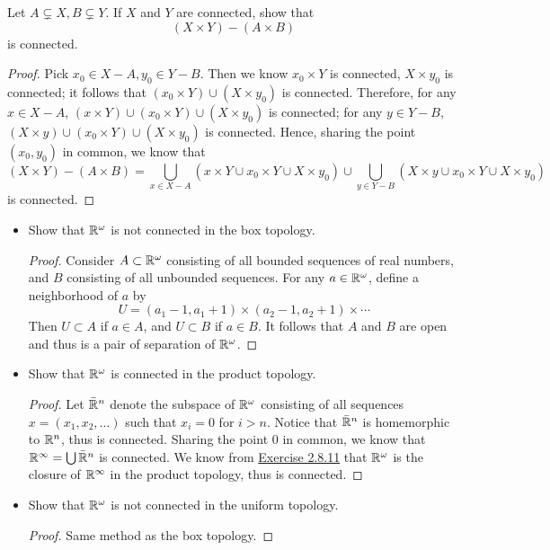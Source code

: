 \documentclass[12pt,a4paper]{article}
\begin{document}
    \begin{ex}
        Let $A\subsetneq X,B\subsetneq Y$. If $X$ and $Y$ are connected, show that 
        $$
        (X\times Y)-(A\times B)
        $$
        is connected.
    \end{ex}
    \begin{proof}
        Pick $x_0\in X-A, y_0\in Y-B$. Then we know $x_0\times Y$ is connected, $X\times y_0$ is connected; it follows that $(x_0\times Y)\cup (X\times y_0)$ is connected. Therefore, for any $x\in X-A$, $(x\times Y)\cup (x_0\times Y)\cup (X\times y_0)$ is connected; for any $y\in Y-B$, $(X\times y)\cup (x_0\times Y)\cup (X\times y_0)$ is connected. Hence, sharing the point $(x_0,y_0)$ in common, we know that
        $$
        (X\times Y)-(A\times B)=\bigcup_{x\in X-A}(x\times Y\cup x_0\times Y\cup X\times y_0)\cup\bigcup_{y\in Y-B}(X\times y\cup x_0\times Y\cup X\times y_0)
        $$
        is connected.
    \end{proof}
    \hfill

    \begin{ex}\hfill\label{3.1.15}
        \begin{itemize}
            \item Show that $\mathbb{R}^\omega$ is not connected in the box topology.
            \begin{proof}
                Consider $A\subset\mathbb{R}^\omega$ consisting of all bounded sequences of real numbers, and $B$ consisting of all unbounded sequences. For any $a\in\mathbb{R}^\omega$, define a neighborhood of $a$ by 
                $$
                U=(a_1-1,a_1+1)\times (a_2-1,a_2+1)\times\cdots
                $$
                Then $U\subset A$ if $a\in A$, and $U\subset B$ if $a\in B$. It follows that $A$ and $B$ are open and thus is a pair of separation of $\mathbb{R}^\omega$.
                
            \end{proof}
            \item Show that $\mathbb{R}^\omega$ is connected in the product topology.
            \begin{proof}
                Let $\bar{\mathbb{R}}^n$ denote the subspace of $\mathbb{R}^\omega$ consisting of all sequences $x=(x_1,x_2,\dots)$ such that $x_i=0$ for $i>n$. Notice that $\bar{\mathbb{R}}^n$ is homemorphic to $\mathbb{R}^n$, thus is connected. Sharing the point $0$ in common, we know that $\mathbb{R}^\infty=\bigcup\bar{\mathbb{R}}^n$ is connected. We know from \hyperref[2.8.11]{Exercise 2.8.11} that $\mathbb{R}^\omega$ is the closure of $\mathbb{R}^\infty$ in the product topology, thus is connected.
            \end{proof}
            \item Show that $\mathbb{R}^\omega$ is not connected in the uniform topology.
            \begin{proof}
                Same method as the box topology.
            \end{proof}
        \end{itemize}
    \end{ex}
    \hfill
\end{document}
